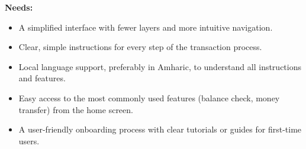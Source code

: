\documentclass[a4paper,12pt]{report}
\begin{document}
\textbf{Needs:}
\begin{itemize}
  \item A simplified interface with fewer layers and more intuitive navigation.
  \item Clear, simple instructions for every step of the transaction process.
  \item Local language support, preferably in Amharic, to understand all instructions and features.
  \item Easy access to the most commonly used features (balance check, money transfer) from the home screen.
  \item A user-friendly onboarding process with clear tutorials or guides for first-time users.
\end{itemize}
\end{document}
